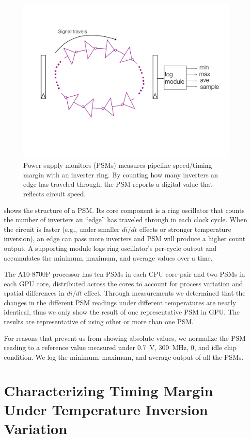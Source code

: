 \begin{figure}[h]
    \centering
    \includegraphics[trim=40 150 40 150,clip,width=0.8\columnwidth]{graphs/temperature/psm.pdf}
    \caption{Power supply monitors (PSMs) measures pipeline speed/timing margin with an inverter ring. By counting how many inverters an edge has traveled through, the PSM reports a digital value that reflects circuit speed.}
    \label{fig:psm-struct}
\end{figure}

 shows the structure of a PSM. Its core component is a ring oscillator that counts the number of inverters an ``edge'' has traveled through in each clock cycle. When the circuit is faster (e.g., under smaller $di/dt$ effects or stronger temperature inversion), an edge can pass more inverters and PSM will produce a higher count output. A supporting module logs ring oscillator's per-cycle output and accumulates the minimum, maximum, and average values over a time.

The A10-8700P processor has ten PSMs in each CPU core-pair and two PSMs in each GPU core, distributed across the cores to account for process variation and spatial differences in $di/dt$ effect. Through measurements we determined that the changes in the different PSM readings under different temperatures are nearly identical, thus we only show the result of one representative PSM in GPU. The results are representative of using other or more than one PSM. 

For reasons that prevent us from showing absolute values, we normalize the PSM reading to a reference value measured under 0.7~V, 300~MHz, 0\C, and idle chip condition. We log the minimum, maximum, and average output of all the PSMs. 

\section{Characterizing Timing Margin Under Temperature Inversion Variation}
\label{sec:temperature:characterize}

